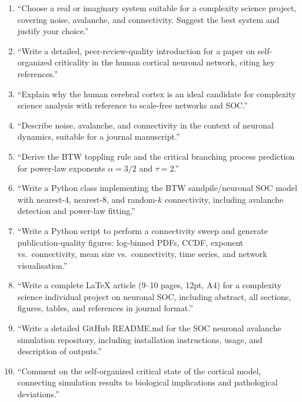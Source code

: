 \documentclass[12pt,a4paper]{article}
\begin{document}
\begin{enumerate}[label=\textbf{P\arabic*.}]
  \item ``Choose a real or imaginary system suitable for a complexity
        science project, covering noise, avalanche, and connectivity.
        Suggest the best system and justify your choice.''
  \item ``Write a detailed, peer-review-quality introduction for a
        paper on self-organized criticality in the human cortical
        neuronal network, citing key references.''
  \item ``Explain why the human cerebral cortex is an ideal candidate
        for complexity science analysis with reference to scale-free
        networks and SOC.''
  \item ``Describe noise, avalanche, and connectivity in the context
        of neuronal dynamics, suitable for a journal manuscript.''
  \item ``Derive the BTW toppling rule and the critical branching
        process prediction for power-law exponents $\alpha = 3/2$ and
        $\tau = 2$.''
  \item ``Write a Python class implementing the BTW sandpile/neuronal
        SOC model with nearest-4, nearest-8, and random-$k$ connectivity,
        including avalanche detection and power-law fitting.''
  \item ``Write a Python script to perform a connectivity sweep and
        generate publication-quality figures: log-binned PDFs, CCDF,
        exponent vs.\ connectivity, mean size vs.\ connectivity,
        time series, and network visualisation.''
  \item ``Write a complete LaTeX article (9--10 pages, 12pt, A4) for a
        complexity science individual project on neuronal SOC,
        including abstract, all sections, figures, tables, and
        references in journal format.''
  \item ``Write a detailed GitHub README.md for the SOC neuronal
        avalanche simulation repository, including installation
        instructions, usage, and description of outputs.''
  \item ``Comment on the self-organized critical state of the
        cortical model, connecting simulation results to biological
        implications and pathological deviations.''
\end{enumerate}
\end{document}
